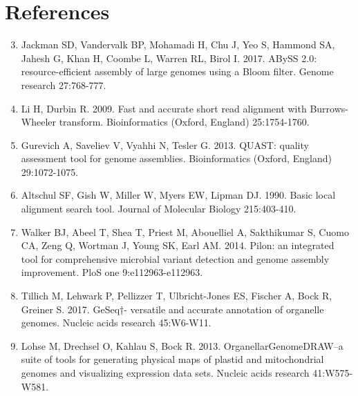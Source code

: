 \documentclass[titlepage,11pt, oneside]{article}   	%
\begin{document}
\section*{References}
\begin{enumerate}
\setcounter{enumi}{2}
\item Jackman SD, Vandervalk BP, Mohamadi H, Chu J, Yeo S, Hammond SA, Jahesh G, Khan H, Coombe L, Warren RL, Birol I. 2017. ABySS 2.0: resource-efficient assembly of large 
genomes using a Bloom filter. Genome research 27:768-777.
\item Li H, Durbin R. 2009. Fast and accurate short read alignment with Burrows-Wheeler transform. Bioinformatics (Oxford, England) 25:1754-1760.
\item Gurevich A, Saveliev V, Vyahhi N, Tesler G. 2013. QUAST: quality assessment tool for genome assemblies. Bioinformatics (Oxford, England) 29:1072-1075.
\item Altschul SF, Gish W, Miller W, Myers EW, Lipman DJ. 1990. Basic local alignment search tool. Journal of Molecular Biology 215:403-410.
\item Walker BJ, Abeel T, Shea T, Priest M, Abouelliel A, Sakthikumar S, Cuomo CA, Zeng Q, Wortman J, Young SK, Earl AM. 2014. Pilon: an integrated tool for comprehensive microbial variant detection and genome assembly improvement. PloS one 9:e112963-e112963.
\item Tillich M, Lehwark P, Pellizzer T, Ulbricht-Jones ES, Fischer A, Bock R, Greiner S. 2017. GeSeq†- versatile and accurate annotation of organelle genomes. Nucleic acids research 45:W6-W11.
\item Lohse M, Drechsel O, Kahlau S, Bock R. 2013. OrganellarGenomeDRAW--a suite of tools for generating physical maps of plastid and mitochondrial genomes and visualizing expression data sets. Nucleic acids research 41:W575-W581.
\end{enumerate}
\end{document}
